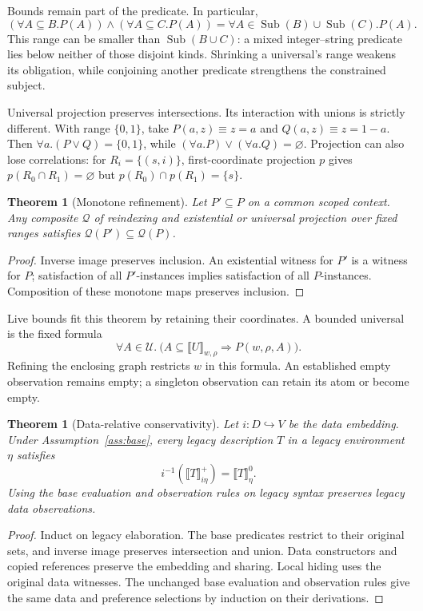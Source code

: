 \documentclass[10pt,a4paper]{article}
\newcommand{\sem}[1]{\llbracket #1\rrbracket}
\newcommand{\U}{\mathcal U}
\newtheorem{theorem}[definition]{Theorem}
\theoremstyle{remark}
\begin{document}
Bounds remain part of the predicate. In particular,
\[
 (\forall A\subseteq B.P(A))\land(\forall A\subseteq C.P(A))
 =\forall A\in\operatorname{Sub}(B)\cup\operatorname{Sub}(C).P(A).
\]
This range can be smaller than $\operatorname{Sub}(B\cup C)$: a mixed
integer--string predicate lies below neither of those disjoint kinds.
Shrinking a universal's range weakens its obligation, while conjoining another
predicate strengthens the constrained subject.

Universal projection preserves intersections. Its interaction with unions is
strictly different. With range $\{0,1\}$, take $P(a,z)\equiv z=a$ and
$Q(a,z)\equiv z=1-a$. Then $\forall a.(P\lor Q)=\{0,1\}$, while
$(\forall a.P)\lor(\forall a.Q)=\varnothing$. Projection can also lose
correlations: for $R_i=\{(s,i)\}$, first-coordinate projection $p$ gives
$p(R_0\cap R_1)=\varnothing$ but $p(R_0)\cap p(R_1)=\{s\}$.

\begin{theorem}[Monotone refinement]\label{thm:monotonicity}
Let $P'\subseteq P$ on a common scoped context. Any composite $\mathcal Q$ of
reindexing and existential or universal projection over fixed ranges satisfies
$\mathcal Q(P')\subseteq\mathcal Q(P)$.
\end{theorem}
\begin{proof}
Inverse image preserves inclusion. An existential witness for $P'$ is a
witness for $P$; satisfaction of all $P'$-instances implies satisfaction of all
$P$-instances. Composition of these monotone maps preserves inclusion.
\end{proof}

Live bounds fit this theorem by retaining their coordinates. A bounded
universal is the fixed formula
\[
 \forall A\in\U.\
    \bigl(A\subseteq\sem U_{w,\rho}\Longrightarrow P(w,\rho,A)\bigr).
\]
Refining the enclosing graph restricts $w$ in this formula. An established empty
observation remains empty; a singleton observation can retain its atom or
become empty.

\begin{theorem}[Data-relative conservativity]\label{thm:conservative}
Let $i:D\hookrightarrow V$ be the data embedding. Under
Assumption~\ref{ass:base}, every legacy description $T$ in a legacy environment $\eta$ satisfies
\[
 i^{-1}(\sem T^+_{i\eta})=\sem T^0_\eta.
\]
Using the base evaluation and observation rules on legacy syntax preserves
legacy data observations.
\end{theorem}
\begin{proof}
Induct on legacy elaboration. The base predicates restrict to their original
sets, and inverse image preserves intersection and union. Data constructors
and copied references preserve the embedding and sharing. Local hiding uses
the original data witnesses. The unchanged base evaluation and observation
rules give the same data and preference selections by induction on their
derivations.
\end{proof}
\end{document}
